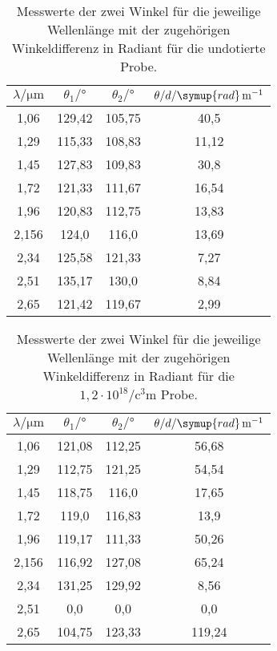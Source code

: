 \begin{table}[H]
  \centering
  \begin{tabular}{c c c c}
    $\lambda/\si{\micro\meter}$ & $\theta_{1}/\si{\degree}$ & $\theta_{2}/\si{\degree}$ & $\theta/d/\symup{rad}\, \si{m}^{-1}$\\
    \midrule
    1,06  &  129,42  &  105,75  &  40,5 \\
    1,29  &  115,33  &  108,83  &  11,12 \\
    1,45  &  127,83  &  109,83  &  30,8 \\
    1,72  &  121,33  &  111,67  &  16,54 \\
    1,96  &  120,83  &  112,75  &  13,83 \\
    2,156 &  124,0   &  116,0   &  13,69 \\
    2,34  &  125,58  &  121,33  &  7,27 \\
    2,51  &  135,17  &  130,0   &  8,84 \\
    2,65  &  121,42  &  119,67  &  2,99 \\
    \bottomrule
  \end{tabular}
  \caption{Messwerte der zwei Winkel für die jeweilige Wellenlänge mit der zugehörigen Winkeldifferenz in Radiant für die undotierte Probe.}
  \label{tab:m1}
\end{table}

\begin{table}[H]
  \centering
  \begin{tabular}{c c c c}
    $\lambda/\si{\micro\meter}$ & $\theta_{1}/\si{\degree}$ & $\theta_{2}/\si{\degree}$ & $\theta/d/\symup{rad}\, \si{m}^{-1}$\\
    \midrule
    1,06  &  121,08  &  112,25  &  56,68 \\
    1,29  &  112,75  &  121,25  &  54,54 \\
    1,45  &  118,75  &  116,0   &  17,65 \\
    1,72  &  119,0   &  116,83  &  13,9 \\
    1,96  &  119,17  &  111,33  &  50,26 \\
    2,156 &  116,92  &  127,08  &  65,24 \\
    2,34  &  131,25  &  129,92  &  8,56 \\
    2,51  &  0,0     &  0,0     &  0,0 \\
    2,65  &  104,75  &  123,33  &  119,24 \\
    \bottomrule
  \end{tabular}
  \caption{Messwerte der zwei Winkel für die jeweilige Wellenlänge mit der zugehörigen Winkeldifferenz in Radiant für die $1,2 \cdot 10^{18} \si{\per\cubic\centi\metre}$ Probe.}
  \label{tab:m1}
\end{table}

